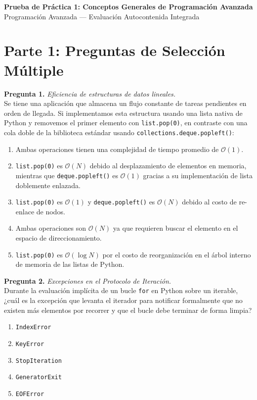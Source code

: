 \documentclass[12pt,letterpaper]{article}
\begin{document}
\begin{center}
  {\large \textbf{Prueba de Práctica 1: Conceptos Generales de Programación Avanzada}} \\
  \medskip
  {Programación Avanzada --- Evaluación Autocontenida Integrada}
\end{center}

\bigskip

\section*{Parte 1: Preguntas de Selección Múltiple}

\textbf{Pregunta 1.} \textit{Eficiencia de estructuras de datos lineales.} \\
Se tiene una aplicación que almacena un flujo constante de tareas pendientes en orden de llegada. Si implementamos esta estructura usando una lista nativa de Python y removemos el primer elemento con \texttt{list.pop(0)}, en contraste con una cola doble de la biblioteca estándar usando \texttt{collections.deque.popleft()}:
\begin{enumerate}[label=\alph*)]
  \item Ambas operaciones tienen una complejidad de tiempo promedio de $\mathcal{O}(1)$.
  \item \texttt{list.pop(0)} es $\mathcal{O}(N)$ debido al desplazamiento de elementos en memoria, mientras que \texttt{deque.popleft()} es $\mathcal{O}(1)$ gracias a su implementación de lista doblemente enlazada.
  \item \texttt{list.pop(0)} es $\mathcal{O}(1)$ y \texttt{deque.popleft()} es $\mathcal{O}(N)$ debido al costo de re-enlace de nodos.
  \item Ambas operaciones son $\mathcal{O}(N)$ ya que requieren buscar el elemento en el espacio de direccionamiento.
  \item \texttt{list.pop(0)} es $\mathcal{O}(\log N)$ por el costo de reorganización en el árbol interno de memoria de las listas de Python.
\end{enumerate}

\bigskip

\textbf{Pregunta 2.} \textit{Excepciones en el Protocolo de Iteración.} \\
Durante la evaluación implícita de un bucle \texttt{for} en Python sobre un iterable, ¿cuál es la excepción que levanta el iterador para notificar formalmente que no existen más elementos por recorrer y que el bucle debe terminar de forma limpia?
\begin{enumerate}[label=\alph*)]
  \item \texttt{IndexError}
  \item \texttt{KeyError}
  \item \texttt{StopIteration}
  \item \texttt{GeneratorExit}
  \item \texttt{EOFError}
\end{enumerate}
\end{document}
